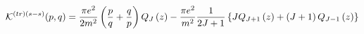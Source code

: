 \begin{equation}
\mathcal{K}^{\left( tr\right) \left( s-s\right) }(p,q)=\frac{\pi e^{2}}{%
2m^{2}}\left( \frac{p}{q}+\frac{q}{p}\right) Q_{J}\left( z\right) -\frac{\pi
e^{2}}{m^{2}}\frac{1}{2J+1}\left\{ JQ_{J+1}\left( z\right) +\left(
J+1\right) Q_{J-1}\left( z\right) \right\}
\end{equation}

